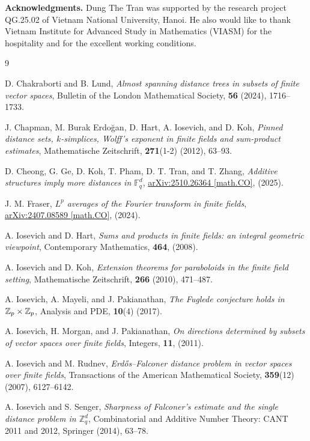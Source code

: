 \documentclass{article}
\newcommand{\1}{\mathbf{1}}
\begin{document}
{\bf Acknowledgments.} 
Dung The Tran was supported by the research project QG.25.02 of Vietnam National University, Hanoi. He also would like to thank Vietnam Institute for Advanced Study in Mathematics (VIASM) for the hospitality and for the excellent working conditions. 




\begin{thebibliography}{9}


D. Chakraborti and B. Lund, \textit{Almost spanning distance trees in subsets of finite vector spaces}, Bulletin of the London Mathematical Society, \textbf{56} (2024), 1716--1733.

J. Chapman, M. Burak {Erdo\u{g}an}, D. Hart, A. Iosevich, and D. Koh, \textit{Pinned distance sets, {$k$}-simplices, {W}olff's exponent in finite fields and sum-product estimates}, Mathematische Zeitschrift, \textbf{271}(1-2) (2012), 63--93.

D. Cheong, G. Ge, D. Koh, T. Pham, D. T. Tran, and T. Zhang, \textit{Additive structures imply more distances in $\mathbb {F} _q^ d$}, \href{https://arxiv.org/abs/2510.26364}{arXiv:2510.26364 [math.CO]}, (2025).

J. M. Fraser, \textit{$L^p$ averages of the Fourier transform in finite fields}, 
\href{https://arxiv.org/abs/2407.08589}{arXiv:2407.08589 [math.CO]}, (2024).

 A. Iosevich and D. Hart, \textit{Sums and products in finite fields: an integral geometric viewpoint}, Contemporary Mathematics, \textbf{464}, (2008). 

 A. Iosevich and D. Koh, \textit{Extension theorems for paraboloids in the finite field setting}, Mathematische Zeitschrift, \textbf{266} (2010), 471--487. 

 A. Iosevich, A. Mayeli, and J. Pakianathan, \textit{The Fuglede conjecture holds in ${\Bbb Z}_p \times {\Bbb Z}_p$}, Analysis and PDE, \textbf{10}(4) (2017). 

 A. Iosevich, H. Morgan, and J. Pakianathan, {\it On directions determined by subsets of vector spaces over finite fields}, Integers, \textbf{11}, (2011). 

A. Iosevich and M. Rudnev,
\textit{Erd\H{o}s--Falconer distance problem in vector spaces over finite fields}, Transactions of the American Mathematical Society, \textbf{359}(12) (2007), 6127--6142.


 A. Iosevich and S. Senger, \textit{Sharpness of Falconer's estimate and the single distance problem in $\mathbb Z_q^d$}, Combinatorial and Additive Number Theory: CANT 2011 and 2012, Springer (2014), 63--78.



\end{thebibliography}
\end{document}
